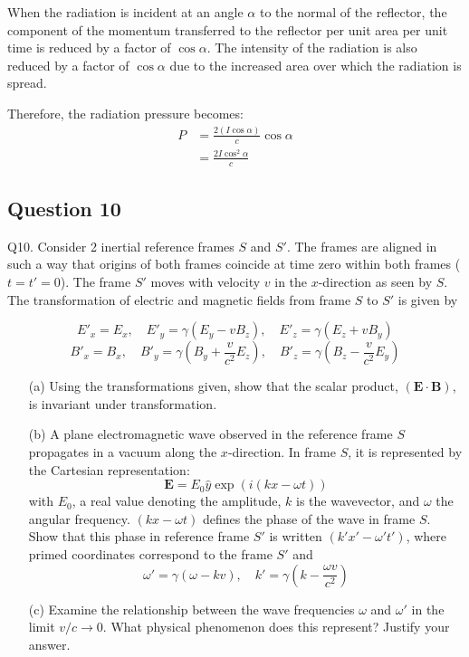 \documentclass{article}
\begin{document}
When the radiation is incident at an angle $\alpha$ to the normal of the reflector, the component of the momentum transferred to the reflector per unit area per unit time is reduced by a factor of $\cos \alpha$. The intensity of the radiation is also reduced by a factor of $\cos \alpha$ due to the increased area over which the radiation is spread.

Therefore, the radiation pressure becomes:
\begin{align*}
P &= \frac{2 (I \cos \alpha)}{c} \cos \alpha \\
&= \frac{2I \cos^2 \alpha}{c}
\end{align*}

\subsection{Question 10}
Q10. Consider 2 inertial reference frames \( S \) and \( S' \). The frames are aligned in such a way that origins of both frames coincide at time zero within both frames (\( t = t' = 0 \)). The frame \( S' \) moves with velocity \( v \) in the \( x \)-direction as seen by \( S \). The transformation of electric and magnetic fields from frame \( S \) to \( S' \) is given by 

\[
E'_x = E_x, \quad E'_y = \gamma (E_y - v B_z), \quad E'_z = \gamma (E_z + v B_y)
\]
\[
B'_x = B_x, \quad B'_y = \gamma \left( B_y + \frac{v}{c^2} E_z \right), \quad B'_z = \gamma \left( B_z - \frac{v}{c^2} E_y \right)
\]

\begin{enumerate}
    \item[(a)] Using the transformations given, show that the scalar product, \( (\mathbf{E} \cdot \mathbf{B}) \), is invariant under transformation.
    
    \item[(b)] A plane electromagnetic wave observed in the reference frame \( S \) propagates in a vacuum along the \( x \)-direction. In frame \( S \), it is represented by the Cartesian representation:
    \[
    \mathbf{E} = E_0 \hat{y} \exp \left( i (k x - \omega t) \right)
    \]
    with \( E_0 \), a real value denoting the amplitude, \( k \) is the wavevector, and \( \omega \) the angular frequency. \( (kx - \omega t) \) defines the phase of the wave in frame \( S \). Show that this phase in reference frame \( S' \) is written \( (k' x' - \omega' t') \), where primed coordinates correspond to the frame \( S' \) and 
    \[
    \omega' = \gamma (\omega - k v), \quad k' = \gamma \left( k - \frac{\omega v}{c^2} \right)
    \]

    \item[(c)] Examine the relationship between the wave frequencies \( \omega \) and \( \omega' \) in the limit \( v / c \to 0 \). What physical phenomenon does this represent? Justify your answer.
\end{enumerate}
\end{document}
